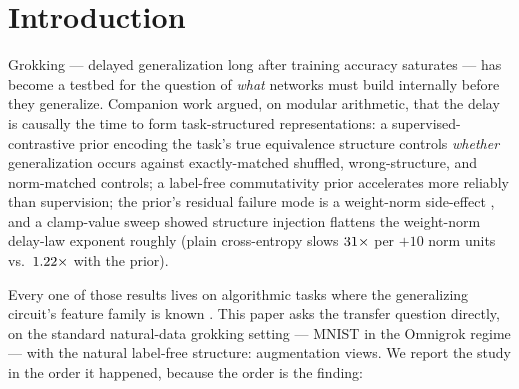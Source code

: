 \documentclass[11pt]{article}
\begin{document}
\section{Introduction}

Grokking --- delayed generalization long after training accuracy saturates
\citep{power2022grokking} --- has become a testbed for the question of \emph{what} networks must
build internally before they generalize. Companion work \citep{companion2026a,companion2026b}
argued, on modular arithmetic, that the delay is causally the time to form task-structured
representations: a supervised-contrastive prior \citep{khosla2020supervised} encoding the task's
true equivalence structure controls \emph{whether} generalization occurs against exactly-matched
shuffled, wrong-structure, and norm-matched controls; a label-free commutativity prior
accelerates more reliably than supervision; the prior's residual failure mode is a weight-norm
side-effect \citep{weightnormdelay2026}, and a clamp-value sweep showed structure injection
flattens the weight-norm delay-law exponent roughly \pfAlgFlatten{} (plain cross-entropy slows
$31\times$ per $+10$ norm units vs.\ $1.22\times$ with the prior).

Every one of those results lives on algorithmic tasks where the generalizing circuit's feature
family is known \citep{nanda2023progress,gromov2023grokking}. This paper asks the transfer
question directly, on the standard natural-data grokking setting --- MNIST in the Omnigrok
regime \citep{liu2023omnigrok} --- with the natural label-free structure: augmentation views.
We report the study in the order it happened, because the order is the finding:
\end{document}
